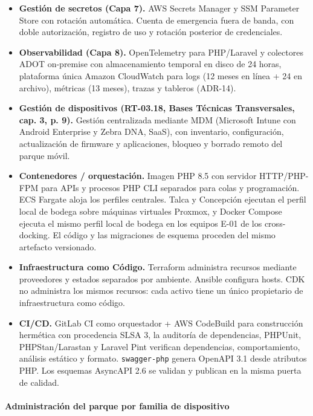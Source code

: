 \begin{itemize}
\item \textbf{Gestión de secretos (Capa 7).} AWS Secrets Manager y SSM Parameter Store con rotación automática. Cuenta de emergencia fuera de banda, con doble autorización, registro de uso y rotación posterior de credenciales.

\item \textbf{Observabilidad (Capa 8).} OpenTelemetry para PHP/Laravel y colectores ADOT on-premise con almacenamiento temporal en disco de 24 horas, plataforma única Amazon CloudWatch para logs (12 meses en línea + 24 en archivo), métricas (13 meses), trazas y tableros (ADR-14).

\item \textbf{Gestión de dispositivos (RT-03.18, Bases Técnicas Transversales, cap. 3, p. 9).} Gestión centralizada mediante MDM (Microsoft Intune con Android Enterprise y Zebra DNA, SaaS), con inventario, configuración, actualización de firmware y aplicaciones, bloqueo y borrado remoto del parque móvil.

\item \textbf{Contenedores / orquestación.} Imagen PHP 8.5 con servidor HTTP/PHP-FPM para APIs y procesos PHP CLI separados para colas y programación. ECS Fargate aloja los perfiles centrales. Talca y Concepción ejecutan el perfil local de bodega sobre máquinas virtuales Proxmox, y Docker Compose ejecuta el mismo perfil local de bodega en los equipos E-01 de los cross-docking. El código y las migraciones de esquema proceden del mismo artefacto versionado.

\item \textbf{Infraestructura como Código.} Terraform administra recursos mediante proveedores y estados separados por ambiente. Ansible configura hosts. CDK no administra los mismos recursos: cada activo tiene un único propietario de infraestructura como código.

\item \textbf{CI/CD.} GitLab CI como orquestador + AWS CodeBuild para construcción hermética con procedencia SLSA 3, la auditoría de dependencias, PHPUnit, PHPStan/Larastan y Laravel Pint verifican dependencias, comportamiento, análisis estático y formato. \texttt{swagger-php} genera OpenAPI 3.1 desde atributos PHP. Los esquemas AsyncAPI 2.6 se validan y publican en la misma puerta de calidad.
\end{itemize}

\paragraph{Administración del parque por familia de dispositivo}

